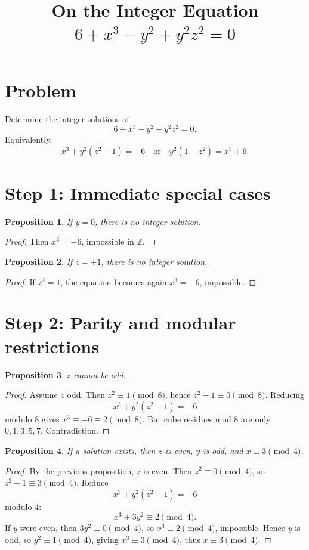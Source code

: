 \documentclass[11pt]{article}
\title{On the Integer Equation $6+x^3-y^2+y^2z^2=0$}
\author{}
\date{}
\newtheorem{prop}{Proposition}
\begin{document}
\maketitle

\section*{Problem}
Determine the integer solutions of
\[
6+x^3-y^2+y^2z^2=0.
\]
Equivalently,
\[
x^3+y^2(z^2-1)=-6
\quad\text{or}\quad
y^2(1-z^2)=x^3+6.
\]

\section*{Step 1: Immediate special cases}

\begin{prop}
If $y=0$, there is no integer solution.
\end{prop}
\begin{proof}
Then $x^3=-6$, impossible in $\mathbb Z$.
\end{proof}

\begin{prop}
If $z=\pm1$, there is no integer solution.
\end{prop}
\begin{proof}
If $z^2=1$, the equation becomes again $x^3=-6$, impossible.
\end{proof}

\section*{Step 2: Parity and modular restrictions}

\begin{prop}
$z$ cannot be odd.
\end{prop}
\begin{proof}
Assume $z$ odd. Then $z^2\equiv1\pmod 8$, hence $z^2-1\equiv0\pmod 8$.
Reducing
\[
x^3+y^2(z^2-1)=-6
\]
modulo $8$ gives $x^3\equiv-6\equiv2\pmod 8$.
But cube residues mod $8$ are only $0,1,3,5,7$. Contradiction.
\end{proof}

\begin{prop}
If a solution exists, then $z$ is even, $y$ is odd, and $x\equiv3\pmod 4$.
\end{prop}
\begin{proof}
By the previous proposition, $z$ is even.
Then $z^2\equiv0\pmod4$, so $z^2-1\equiv3\pmod4$. Reduce
\[
x^3+y^2(z^2-1)=-6
\]
modulo $4$:
\[
x^3+3y^2\equiv2\pmod4.
\]
If $y$ were even, then $3y^2\equiv0\pmod4$, so $x^3\equiv2\pmod4$, impossible.
Hence $y$ is odd, so $y^2\equiv1\pmod4$, giving $x^3\equiv3\pmod4$, thus $x\equiv3\pmod4$.
\end{proof}
\end{document}
